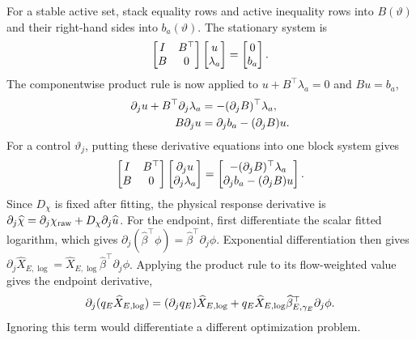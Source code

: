 For a stable active set, stack equality rows and active inequality rows into $B(\vartheta)$ and their right-hand sides into $b_a(\vartheta)$. The stationary system is
\begin{equation}
\equationname{Linear system for a fixed active set of projection constraints}
\begin{bmatrix}I&B^\top\\B&0\end{bmatrix}
\begin{bmatrix}u\\\lambda_a\end{bmatrix}
=\begin{bmatrix}0\\b_a\end{bmatrix}.
\label{eq:plant_active_system}
\end{equation}
The componentwise product rule is now applied to $u+B^\top\lambda_a=0$ and $Bu=b_a$,
\begin{align}
\equationname{Differentiated stationarity for a control-dependent active set}
\partial_j u+B^\top\partial_j\lambda_a&=-(\partial_jB)^\top\lambda_a,\\
\equationname{Differentiated feasibility for a control-dependent active set}
B\partial_j u&=\partial_jb_a-(\partial_jB)u.
\end{align}
For a control $\vartheta_j$, putting these derivative equations into one block system gives
\begin{equation}
\equationname{Joint sensitivity system for a control-dependent active set}
\begin{bmatrix}I&B^\top\\B&0\end{bmatrix}
\begin{bmatrix}\partial_j u\\\partial_j\lambda_a\end{bmatrix}
=\begin{bmatrix}-(\partial_jB)^\top\lambda_a\\
\partial_jb_a-(\partial_jB)u\end{bmatrix}.
\label{eq:plant_active_sensitivity}
\end{equation}
Since $D_\chi$ is fixed after fitting, the physical response derivative is $\partial_j\widehat\chi=\partial_j\chi_{\rm raw}+D_\chi\partial_j\widehat u$. For the endpoint, first differentiate the scalar fitted logarithm, which gives $\partial_j(\widehat\beta^\top\phi)=\widehat\beta^\top\partial_j\phi$. Exponential differentiation then gives $\partial_j\widehat X_{E,\log}=\widehat X_{E,\log}\widehat\beta^\top\partial_j\phi$. Applying the product rule to its flow-weighted value gives the endpoint derivative,
\begin{equation}
\equationname{Derivative of the control-dependent overflow-solids target}
\partial_j(q_E\widehat X_{E,\log})
=(\partial_jq_E)\widehat X_{E,\log}
+q_E\widehat X_{E,\log}\widehat\beta_{E,\gamma_E}^\top\partial_j\phi.
\end{equation}
Ignoring this term would differentiate a different optimization problem.

